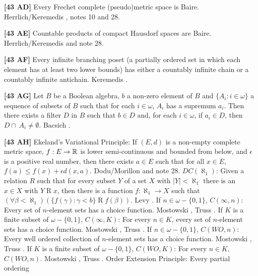 \item{}{\bf [43 AD]} Every Frechet complete (pseudo)metric space is Baire.
\ac{Herrlich/Keremedis} \cite{1999a}, notes 10 and 28.
\smallskip
\item{}{\bf [43 AE]} Countable products of compact Hausdorf spaces are
Baire. \ac{Herrlich/Keremedis} \cite{1999a} and note 28.
\smallskip
\item{}{\bf [43 AF]} Every infinite branching poset (a partially ordered
set in which each element has at least two lower bounds) has either a
countably infinite chain or a countably infinite antichain. \ac{Keremedis}
\cite{1999a}.
\smallskip
\item{}{\bf [43 AG]} Let $B$ be a Boolean algebra, $b$ a non-zero element
of $B$ and $\{A_i: i\in\omega\}$ a sequence of subsets of $B$ such that
for each $i\in\omega$, $A_i$ has a supremum $a_i$. Then there exists
a filter $D$ in $B$ such that $b\in D$ and, for each $i\in\omega$,
if $a_i\in D$, then $D\cap\ A_i\neq\emptyset$. \ac{Bacsich} \cite{1972b}.
\smallskip
\item{}{\bf [43 AH]} Ekeland's Variational Principle: If $(E,d)$ is
a non-empty complete metric space, $f: E\to\Bbb R$ is lower
semi-continuous and bounded from below, and $\epsilon$ is a positive
real number, then there exists $a\in E$ such that for all $x\in E$,
$f(a)\le f(x)+\epsilon d(x,a)$.  \ac{Dodu/Morillon} \cite{1999} and
note 28.
\medskip
{} $DC(\aleph _{1})$:  Given a relation $R$ such that
for every  subset $Y$ of a set $X$ with $|Y| < \aleph_{1}$ there
is an $x \in  X$  with $Y \mathrel R x$, then there is a function $f:
\aleph_{1} \rightarrow  X$ such that $(\forall\beta < \aleph_{1})
(\{f(\gamma ): \gamma < b \} \mathrel R f(\beta))$.  \ac{Levy} \cite{1964}.
\medskip
{} If $n\in\omega-\{0,1\}$, $C(\infty,n)$:
Every set of $n$-element sets has a choice function. \ac{Mostowski}
\cite{1945}, \ac{Truss} \cite{1973a}.
\medskip
{} If $K$ is a finite subset of $\omega-\{0,1\}$,
$C(\infty,K)$: For every $n\in K$, every set of $n$-element sets has
a choice function.  \ac{Mostowski} \cite{1945}, \ac{Truss} \cite{1973a}.
\medskip
{}  If $n\in\omega-\{0,1\}$, $C(WO,n)$:
Every well ordered collection of $n$-element sets has a choice function.
\ac{Mostowski} \cite{1945}, \ac{Truss} \cite{1973a}.
\medskip
{} If $K$ is a finite subset of $\omega-\{0,1\}$,
$C(WO,K)$: For every $n\in K,$ $C(WO,n)$. \ac{Mostowski} \cite{1945},
\ac{Truss} \cite{1973a}.
\medskip
{} Order Extension Principle:  Every partial ordering
